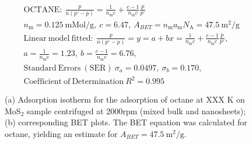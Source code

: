 

\begin{align*}
&\mathrm{OCTANE:}\ \frac{p}{n(p^\circ-p)}=\frac{1}{n_\mathrm{m}c}+\frac{c-1}{n_\mathrm{m}c}\frac{p}{p^\circ}\\
&{n_\mathrm{m}}=0.125\ \mathrm{mMol/g},\ c=6.47,\ A_{BET}={n_\mathrm{m}}{a_\mathrm{m}}{N_\mathrm{A}}=47.5\ \mathrm{m}^2\mathrm{/g}\\
&\mathrm{Linear\ model\ fitted:}\ \frac{p}{n(p^\circ-p)}=y=a+bx=\frac{1}{n_\mathrm{m}c}+\frac{c-1}{n_\mathrm{m}c}\frac{p}{p^\circ},\\
&a=\frac{1}{n_\mathrm{m}c}=1.23,\ b=\frac{c-1}{n_\mathrm{m}c}=6.76,\\
&\mathrm{Standard\ Errors\ (SER)}\ \sigma_a=0.0497,\ \sigma_b=0.170,\\
&\mathrm{Coefficient\ of\ Determination}\ R^2 = 0.995
\end{align*}


\begin{figure}[htb]
\hfill
{}
\caption{(a) Adsorption isotherm for the adsorption of octane at XXX K on MoS$_2$ 
sample centrifuged at 2000rpm (mixed bulk and nanosheets);
(b) corresponding BET plots. The BET equation was calculated for octane, yielding an estimate for $A_{BET}=47.5\ \mathrm{m}^2\mathrm{/g}$.}

\label{fig:sa-Nanosheets-Prep-I-1500rpm-10mg-01-3mm-30C-S1-SA-10ml-run2}
\end{figure}


